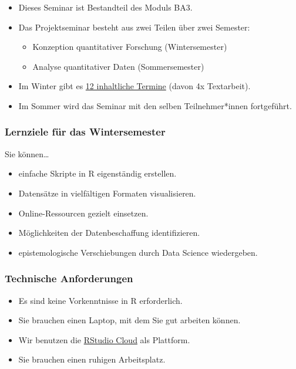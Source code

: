 \documentclass[11pt,german,a4paper]{article}
\providecommand{\tightlist}{%
  \setlength{\itemsep}{0pt}\setlength{\parskip}{0pt}}
\begin{document}
\begin{itemize}
\tightlist
\item
  Dieses Seminar ist Bestandteil des Moduls BA3.
\item
  Das Projektseminar besteht aus zwei Teilen über zwei Semester:

  \begin{itemize}
  \tightlist
  \item
    Konzeption quantitativer Forschung (Wintersemester)
  \item
    Analyse quantitativer Daten (Sommersemester)
  \end{itemize}
\item
  Im Winter gibt es \protect\hyperlink{terminuxfcberblick}{12 inhaltliche Termine} (davon 4x Textarbeit).
\item
  Im Sommer wird das Seminar mit den selben Teilnehmer*innen fortgeführt.
\end{itemize}

\hypertarget{lernziele-fuxfcr-das-wintersemester}{%
\subsubsection{Lernziele für das Wintersemester}\label{lernziele-fuxfcr-das-wintersemester}}

Sie können\ldots{}

\begin{itemize}
\tightlist
\item
  einfache Skripte in R eigenständig erstellen.
\item
  Datensätze in vielfältigen Formaten visualisieren.
\item
  Online-Ressourcen gezielt einsetzen.
\item
  Möglichkeiten der Datenbeschaffung identifizieren.
\item
  epistemologische Verschiebungen durch Data Science wiedergeben.
\end{itemize}

\hypertarget{technische-anforderungen}{%
\subsubsection{Technische Anforderungen}\label{technische-anforderungen}}

\begin{itemize}
\tightlist
\item
  Es sind keine Vorkenntnisse in R erforderlich.
\item
  Sie brauchen einen Laptop, mit dem Sie gut arbeiten können.
\item
  Wir benutzen die \href{https://rstudio.cloud}{RStudio Cloud} als Plattform.
\item
  Sie brauchen einen ruhigen Arbeitsplatz.
\end{itemize}
\end{document}
